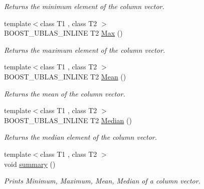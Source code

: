\begin{DoxyCompactItemize}
\begin{DoxyCompactList}\small\item\em Returns the minimum element of the column vector. \end{DoxyCompactList}\item 
{\footnotesize template$<$class T1 , class T2 $>$ }\\B\+O\+O\+S\+T\+\_\+\+U\+B\+L\+A\+S\+\_\+\+I\+N\+L\+I\+NE T2 \hyperlink{classboost_1_1numeric_1_1ublas_1_1df__column_a92473d4054d19c440ddc4460c33f3ca7}{Max} ()\hypertarget{classboost_1_1numeric_1_1ublas_1_1df__column_a92473d4054d19c440ddc4460c33f3ca7}{}\label{classboost_1_1numeric_1_1ublas_1_1df__column_a92473d4054d19c440ddc4460c33f3ca7}

\begin{DoxyCompactList}\small\item\em Returns the maximum element of the column vector. \end{DoxyCompactList}\item 
{\footnotesize template$<$class T1 , class T2 $>$ }\\B\+O\+O\+S\+T\+\_\+\+U\+B\+L\+A\+S\+\_\+\+I\+N\+L\+I\+NE T2 \hyperlink{classboost_1_1numeric_1_1ublas_1_1df__column_acb45cd583cbf683ba1a17ad184a3a04e}{Mean} ()\hypertarget{classboost_1_1numeric_1_1ublas_1_1df__column_acb45cd583cbf683ba1a17ad184a3a04e}{}\label{classboost_1_1numeric_1_1ublas_1_1df__column_acb45cd583cbf683ba1a17ad184a3a04e}

\begin{DoxyCompactList}\small\item\em Returns the mean of the column vector. \end{DoxyCompactList}\item 
{\footnotesize template$<$class T1 , class T2 $>$ }\\B\+O\+O\+S\+T\+\_\+\+U\+B\+L\+A\+S\+\_\+\+I\+N\+L\+I\+NE T2 \hyperlink{classboost_1_1numeric_1_1ublas_1_1df__column_a6b133f7f21e72bc7be09e0c3b67c3047}{Median} ()\hypertarget{classboost_1_1numeric_1_1ublas_1_1df__column_a6b133f7f21e72bc7be09e0c3b67c3047}{}\label{classboost_1_1numeric_1_1ublas_1_1df__column_a6b133f7f21e72bc7be09e0c3b67c3047}

\begin{DoxyCompactList}\small\item\em Returns the median element of the column vector. \end{DoxyCompactList}\item 
{\footnotesize template$<$class T1 , class T2 $>$ }\\void \hyperlink{classboost_1_1numeric_1_1ublas_1_1df__column_ad989301c3eb81c0767f144671637bfe3}{summary} ()\hypertarget{classboost_1_1numeric_1_1ublas_1_1df__column_ad989301c3eb81c0767f144671637bfe3}{}\label{classboost_1_1numeric_1_1ublas_1_1df__column_ad989301c3eb81c0767f144671637bfe3}

\begin{DoxyCompactList}\small\item\em Prints Minimum, Maximum, Mean, Median of a column vector. \end{DoxyCompactList}\end{DoxyCompactItemize}
